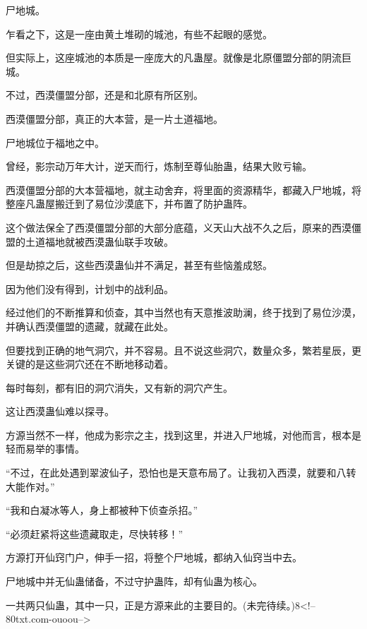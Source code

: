 \begin{this_body}
尸地城。

乍看之下，这是一座由黄土堆砌的城池，有些不起眼的感觉。

但实际上，这座城池的本质是一座庞大的凡蛊屋。就像是北原僵盟分部的阴流巨城。

不过，西漠僵盟分部，还是和北原有所区别。

西漠僵盟分部，真正的大本营，是一片土道福地。

尸地城位于福地之中。

曾经，影宗动万年大计，逆天而行，炼制至尊仙胎蛊，结果大败亏输。

西漠僵盟分部的大本营福地，就主动舍弃，将里面的资源精华，都藏入尸地城，将整座凡蛊屋搬迁到了易位沙漠底下，并布置了防护蛊阵。

这个做法保全了西漠僵盟分部的大部分底蕴，义天山大战不久之后，原来的西漠僵盟的土道福地就被西漠蛊仙联手攻破。

但是劫掠之后，这些西漠蛊仙并不满足，甚至有些恼羞成怒。

因为他们没有得到，计划中的战利品。

经过他们的不断推算和侦查，其中当然也有天意推波助澜，终于找到了易位沙漠，并确认西漠僵盟的遗藏，就藏在此处。

但要找到正确的地气洞穴，并不容易。且不说这些洞穴，数量众多，繁若星辰，更关键的是这些洞穴还在不断地移动着。

每时每刻，都有旧的洞穴消失，又有新的洞穴产生。

这让西漠蛊仙难以探寻。

方源当然不一样，他成为影宗之主，找到这里，并进入尸地城，对他而言，根本是轻而易举的事情。

“不过，在此处遇到翠波仙子，恐怕也是天意布局了。让我初入西漠，就要和八转大能作对。”

“我和白凝冰等人，身上都被种下侦查杀招。”

“必须赶紧将这些遗藏取走，尽快转移！”

方源打开仙窍门户，伸手一招，将整个尸地城，都纳入仙窍当中去。

尸地城中并无仙蛊储备，不过守护蛊阵，却有仙蛊为核心。

一共两只仙蛊，其中一只，正是方源来此的主要目的。(未完待续。)8<!--80txt.com-ouoou-->

\end{this_body}


